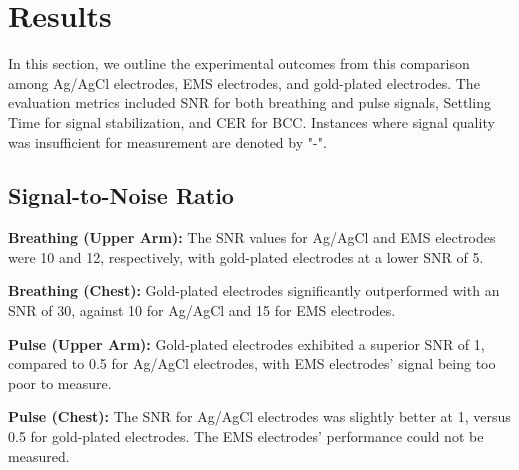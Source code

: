 \documentclass[conference]{IEEEtran}
\begin{document}



%

\section{Results}

In this section, we outline the experimental outcomes from this comparison among Ag/AgCl electrodes, EMS electrodes, and gold-plated electrodes. The evaluation metrics included \gls{SNR} for both breathing and pulse signals, Settling Time for signal stabilization, and \gls{CER}  for \gls{BCC}. Instances where signal quality was insufficient for measurement are denoted by "-".

\subsection{Signal-to-Noise Ratio}

 \textbf{Breathing (Upper Arm):} The \gls{SNR} values for Ag/AgCl and EMS electrodes were 10 and 12, respectively, with gold-plated electrodes at a lower \gls{SNR} of 5.
 
\textbf{Breathing (Chest):} Gold-plated electrodes significantly outperformed with an \gls{SNR} of 30, against 10 for Ag/AgCl and 15 for EMS electrodes.

 \textbf{Pulse (Upper Arm):} Gold-plated electrodes exhibited a superior \gls{SNR} of 1, compared to 0.5 for Ag/AgCl electrodes, with EMS electrodes' signal being too poor to measure.

 \textbf{Pulse (Chest):} The \gls{SNR} for Ag/AgCl electrodes was slightly better at 1, versus 0.5 for gold-plated electrodes. The EMS electrodes' performance could not be measured.
\end{document}
